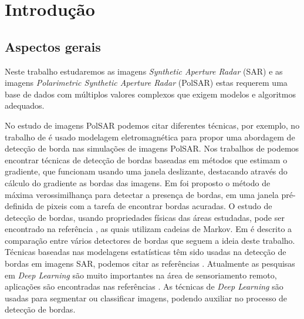 \chapter{Introdução}
\label{cap_acf}

\section{Aspectos gerais}

Neste trabalho estudaremos as imagens \textit{Synthetic Aperture Radar} (SAR) e as imagens \textit{Polarimetric Synthetic Aperture Radar} (PolSAR) estas requerem uma base de dados com múltiplos valores complexos que exigem modelos e algoritmos adequados.

No estudo de imagens PolSAR podemos citar diferentes técnicas, por exemplo, no trabalho de \citet{slf_2008} é usado modelagem eletromagnética para propor uma abordagem de detecção de borda nas simulações de imagens PolSAR. 
Nos trabalhos de \citet{tlb, obw, flmc, fyf} podemos encontrar técnicas de detecção de bordas baseadas em métodos que estimam o gradiente, que funcionam usando uma janela deslizante, destacando através do cálculo do gradiente as bordas das imagens. Em \citet{obw} foi proposto o método de máxima verossimilhança para detectar a presença de bordas, em uma janela pré-definida de pixeis com a tarefa de encontrar bordas acuradas. O estudo de detecção de bordas, usando propriedades físicas das áreas estudadas, pode ser encontrado na referência \citep{bf}, as quais utilizam cadeias de Markov. Em \citep{gfn} é descrito a comparação entre vários detectores de bordas que seguem a ideia deste trabalho. Técnicas baseadas nas modelagens estatísticas têm sido usadas na detecção de bordas em imagens SAR, podemos citar as referências \citep{gmbf, fbgm, horrit, gfn}. 
Atualmente as pesquisas em \textit{Deep Learning} são muito importantes na área de sensoriamento remoto, aplicações são encontradas nas referências \citep{bac, ztmxzxf, tabmm, xstz}. As técnicas de \textit{Deep Learning} são usadas para segmentar ou classificar imagens, podendo auxiliar no processo de detecção de bordas. 

